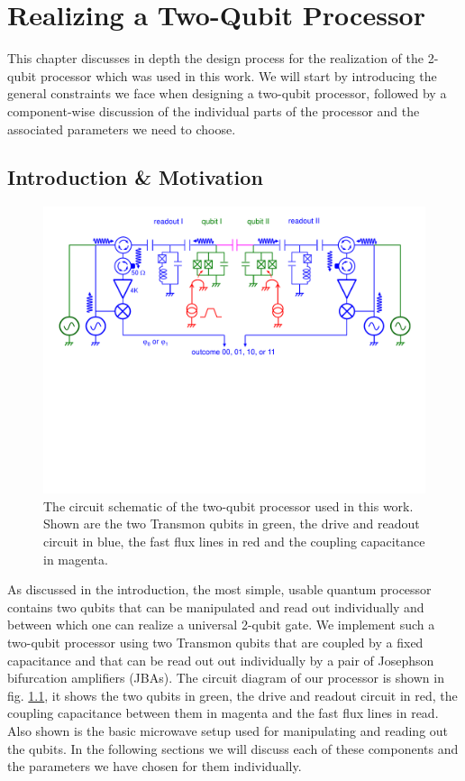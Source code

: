 \chapter{Realizing a Two-Qubit Processor} \label{chapter:design}

This chapter discusses in depth the design process for the realization of the 2-qubit processor which was used in this work. We will start by introducing the general constraints we face when designing a two-qubit processor, followed by a component-wise discussion of the individual parts of the processor and the associated parameters we need to choose.

\section{Introduction \& Motivation}

\begin{figure}[ht!]
  \centering
	\includegraphics[width=1.\textwidth]{"./material/figures/2-qubit-processor/processor schematic"}
	\caption[Circuit schematic of the two-qubit processor]{The circuit schematic of the two-qubit processor used in this work. Shown are the two Transmon qubits in green, the drive and readout circuit in blue, the fast flux lines in red and the coupling capacitance in magenta.}
	\label{fig:2_qubit_chip_circuit_diagram}
\end{figure}

As discussed in the introduction, the most simple, usable quantum processor contains two qubits that can be manipulated and read out individually and between which one can realize a universal 2-qubit gate. We implement such a two-qubit processor using two Transmon qubits that are coupled by a fixed capacitance and that can be read out out individually by a pair of Josephson bifurcation amplifiers (JBAs). The circuit diagram of our processor is shown in fig. \ref{fig:2_qubit_chip_circuit_diagram}, it shows the two qubits in green, the drive and readout circuit in red, the coupling capacitance between them in magenta and the fast flux lines in read. Also shown is the basic microwave setup used for manipulating and reading out the qubits. In the following sections we will discuss each of these components and the parameters we have chosen for them individually.

